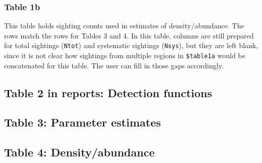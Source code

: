 \documentclass[
]{book}
\newenvironment{Shaded}{\begin{snugshade}}{\end{snugshade}}
\newcommand{\DataTypeTok}[1]{\textcolor[rgb]{0.13,0.29,0.53}{#1}}
\newcommand{\KeywordTok}[1]{\textcolor[rgb]{0.13,0.29,0.53}{\textbf{#1}}}
\newcommand{\NormalTok}[1]{#1}
\newcommand{\OperatorTok}[1]{\textcolor[rgb]{0.81,0.36,0.00}{\textbf{#1}}}
\newcommand{\StringTok}[1]{\textcolor[rgb]{0.31,0.60,0.02}{#1}}
\begin{document}
\hypertarget{table-1b}{%
\subsubsection*{Table 1b}\label{table-1b}}

This table holds sighting counts used in estimates of density/abundance. The rows match the rows for Tables 3 and 4. In this table, columns are still prepared for total sightings (\texttt{Ntot}) and systematic sightings (\texttt{Nsys}), but they are left blank, since it is not clear how sightings from multiple regions in \texttt{\$table1a} would be concatenated for this table. The user can fill in those gaps accordingly.

\begin{Shaded}
\end{Shaded}

\hypertarget{table-2-in-reports-detection-functions}{%
\subsection*{Table 2 in reports: Detection functions}\label{table-2-in-reports-detection-functions}}

\hypertarget{table-3-parameter-estimates}{%
\subsection*{Table 3: Parameter estimates}\label{table-3-parameter-estimates}}

\hypertarget{table-4-densityabundance}{%
\subsection*{Table 4: Density/abundance}\label{table-4-densityabundance}}
\end{document}
